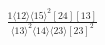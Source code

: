 \documentclass[varwidth, border=5pt]{standalone}
\begin{document}
\begin{my}
$\begin{gathered}
\scriptscriptstyle\frac{1⟨12⟩⟨15⟩^2[24][13]}{⟨13⟩^2⟨14⟩⟨23⟩[23]^2}
\end{gathered}$
\end{my}
\end{document}
